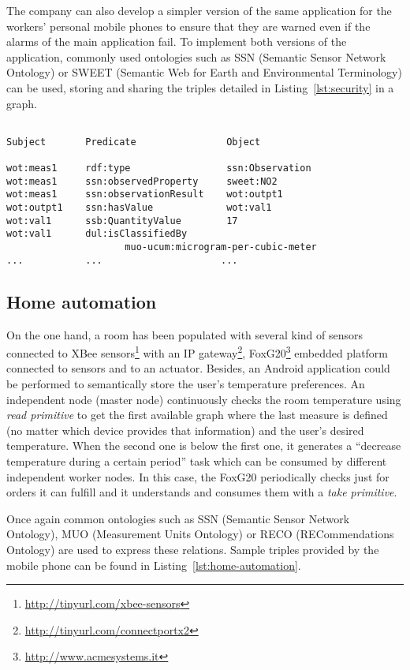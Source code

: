 The company can also develop a simpler version of the same application for the workers' personal mobile phones to ensure
that they are warned even if the alarms of the main application fail. To implement both versions of the application,
commonly used ontologies such as SSN (Semantic Sensor Network Ontology) or SWEET (Semantic Web for Earth and
Environmental Terminology) can be used, storing and sharing the triples detailed in Listing~\ref{lst:security} in a
graph.

\begin{lstlisting}[label=lst:security,caption=Sample triples provided by a $NO_2$ sensor deployed in the facility.]

Subject       Predicate                Object

wot:meas1     rdf:type                 ssn:Observation
wot:meas1     ssn:observedProperty     sweet:NO2
wot:meas1     ssn:observationResult    wot:outpt1
wot:outpt1    ssn:hasValue             wot:val1
wot:val1      ssb:QuantityValue        17
wot:val1      dul:isClassifiedBy
                     muo-ucum:microgram-per-cubic-meter
...           ...                     ...
\end{lstlisting}


\subsection{Home automation}

On the one hand, a room has been populated with several kind of sensors connected to XBee sensors\footnote{\url{
http://tinyurl.com/xbee-sensors}} with an IP gateway\footnote{\url{http://tinyurl.com/connectportx2}},
FoxG20\footnote{\url{http://www.acmesystems.it}} embedded platform connected to sensors and to an actuator.
Besides, an Android application could be performed to semantically store the user's temperature preferences. An
independent
node (master node) continuously checks the room temperature using \textit{read primitive} to get the first available
graph
where the last measure is defined (no matter which device provides that information) and the user's desired temperature.
When the second one is below the first one, it generates a ``decrease temperature during a certain period'' task which
can
be consumed by different independent worker nodes. In this case, the FoxG20 periodically checks just for orders it can
fulfill and it understands and consumes them with a \textit{take primitive}.

Once again common ontologies such as SSN (Semantic Sensor Network Ontology), MUO (Measurement Units Ontology) or RECO
(RECommendations Ontology) are used to express these relations. Sample triples provided by the mobile phone can be found
in Listing~\ref{lst:home-automation}.

